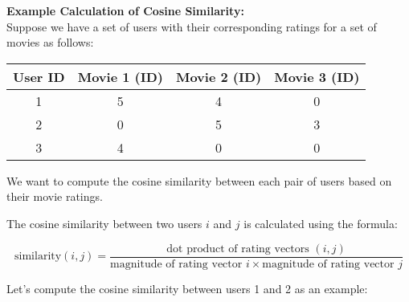 \documentclass[a4paper]{article}
\theoremstyle{plain}
\theoremstyle{definition}
\begin{document}

            \textbf{Example Calculation of Cosine Similarity:}
            \\
            Suppose we have a set of users with their corresponding ratings for a set of movies as follows:
            
            \begin{center}
            \begin{tabular}{|c|c|c|c|}
            \hline
            \textbf{User ID} & \textbf{Movie 1 (ID)} & \textbf{Movie 2 (ID)} & \textbf{Movie 3 (ID)} \\
            \hline
            1 & 5 & 4 & 0 \\
            2 & 0 & 5 & 3 \\
            3 & 4 & 0 & 0 \\
            \hline
            \end{tabular}
            \end{center}
            
            We want to compute the cosine similarity between each pair of users based on their movie ratings.
            
            The cosine similarity between two users $i$ and $j$ is calculated using the formula:
            
            \[
            \text{similarity}(i, j) = \frac{{\text{dot product of rating vectors }(i, j)}}{{\text{magnitude of rating vector }i \times \text{magnitude of rating vector }j}}
            \]
            
            Let's compute the cosine similarity between users 1 and 2 as an example:
            
\end{document}
